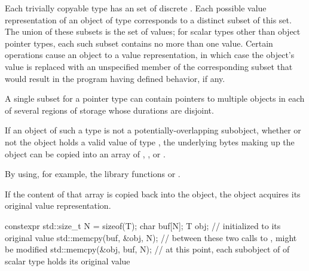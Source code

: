 \pnum
Each trivially copyable type  has an
set of discrete .
%
Each possible value representation of an object of type 
corresponds to a distinct
subset of this set.
The union of these subsets is the set of values;
for scalar types other than object pointer types,
each such subset contains no more than one value.
Certain operations cause an object to
%
%
 a value representation,
in which case the object's value
is replaced with an unspecified member of the corresponding subset that
would result in the program having defined behavior, if any.

\pnum
\begin{note}
A single subset for a pointer type
can contain pointers to multiple objects
in each of several regions of storage whose durations are disjoint.
\end{note}

\pnum
{}%
%
If an object of such a type 
is not a potentially-overlapping subobject,
whether or not the object holds a valid value of type
, the underlying bytes making up the
object can be copied into an array of
,
, or
.
\begin{footnote}
By using, for example, the library
functions  or .
\end{footnote}
If the content of that array
is copied back into the object,
the object acquires its original value representation.
\begin{example}
\begin{codeblock}
constexpr std::size_t N = sizeof(T);
char buf[N];
T obj;                          //  initialized to its original value
std::memcpy(buf, &obj, N);      // between these two calls to ,  might be modified
std::memcpy(&obj, buf, N);      // at this point, each subobject of  of scalar type holds its original value
\end{codeblock}
\end{example}

